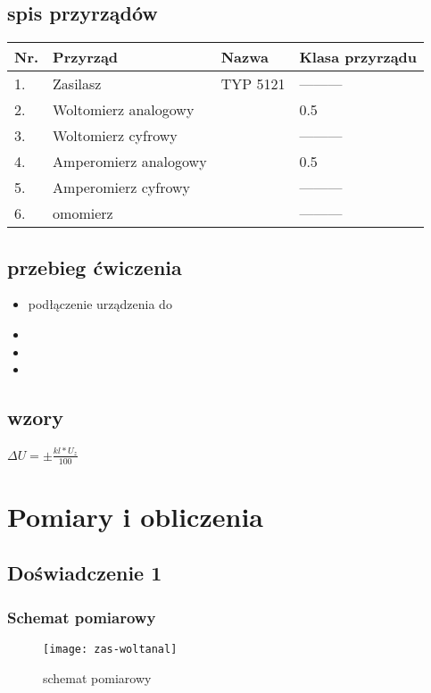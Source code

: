 \documentclass{article}  %
\begin{document}
    \subsection{spis przyrządów}
\begin{table}[H]
    \centering
    \begin{tabular}{|l|l|l|l|}
    \hline
    Nr.&Przyrząd             & Nazwa    & Klasa przyrządu    \\ \hline
    1. &Zasilasz             & TYP 5121 &   ---------        \\ \hline
    2. &Woltomierz analogowy &          &      0.5           \\ \hline
    3. &Woltomierz cyfrowy   &          &   ---------        \\ \hline
    4. &Amperomierz analogowy&          &      0.5           \\ \hline
    5. &Amperomierz cyfrowy  &          &   ---------        \\ \hline
    6. &omomierz             &          &   ---------        \\ \hline
    \end{tabular}
    \end{table}


\subsection{przebieg ćwiczenia}
    \begin{itemize}
        \item podłączenie urządzenia do 
        \item 
        \item 
        \item 
    \end{itemize}
\subsection{wzory}
$\Delta U = \pm \frac{kl \ast U_z}{100}$

\section{Pomiary i obliczenia}
\subsection{Doświadczenie 1}
\subsubsection{Schemat pomiarowy}
    \begin{figure}[H]
        \centering
        \texttt{[image: zas-woltanal]}
        \caption{schemat pomiarowy}
    \end{figure}
\end{document}
